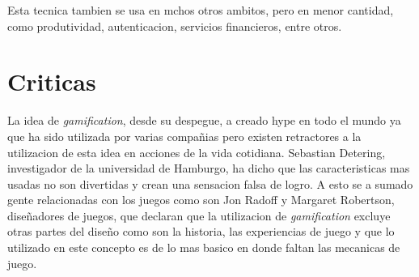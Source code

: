 Esta tecnica tambien se usa en mchos otros ambitos, pero en menor cantidad, como produtividad, 
autenticacion, servicios financieros, entre otros.

\section{Criticas}

La idea de \emph{gamification}, desde su despegue, a creado hype en todo el mundo ya que ha sido
utilizada por varias compañias pero existen retractores a la utilizacion de esta idea en acciones de la
vida cotidiana. Sebastian Detering, investigador de la universidad de Hamburgo, ha dicho que las
caracteristicas mas usadas no son divertidas y crean una sensacion falsa de logro\cite{Gam:Crit:1}.
A esto se a sumado gente relacionadas con los juegos como son Jon Radoff y Margaret Robertson, diseñadores
de juegos, que declaran que la utilizacion de \emph{gamification} excluye otras partes del diseño
como son la historia, las experiencias de juego y que lo utilizado en este concepto es de lo mas basico 
en donde faltan las mecanicas de juego\cite{Gam:Crit:2}.


